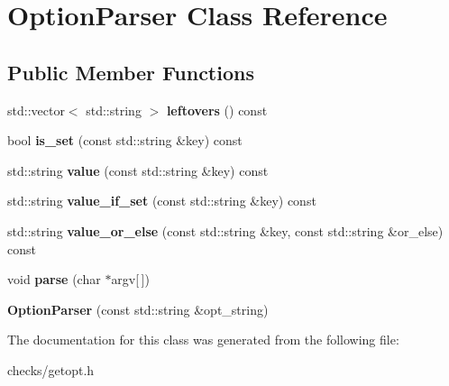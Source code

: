 \hypertarget{classOptionParser}{\section{Option\-Parser Class Reference}
\label{classOptionParser}
}
\subsection*{Public Member Functions}
\begin{DoxyCompactItemize}
\item 
\hypertarget{classOptionParser_ac4abcf013582dd09a6b7b2384c7a483b}{std\-::vector$<$ std\-::string $>$ {\bfseries leftovers} () const }\label{classOptionParser_ac4abcf013582dd09a6b7b2384c7a483b}

\item 
\hypertarget{classOptionParser_ae807908d951c495d7b5db4c970a939fc}{bool {\bfseries is\-\_\-set} (const std\-::string \&key) const }\label{classOptionParser_ae807908d951c495d7b5db4c970a939fc}

\item 
\hypertarget{classOptionParser_aae8bf74d5ea552dc83238045b53eda7e}{std\-::string {\bfseries value} (const std\-::string \&key) const }\label{classOptionParser_aae8bf74d5ea552dc83238045b53eda7e}

\item 
\hypertarget{classOptionParser_a95c5fefd45858094b4c7d29733fbdefd}{std\-::string {\bfseries value\-\_\-if\-\_\-set} (const std\-::string \&key) const }\label{classOptionParser_a95c5fefd45858094b4c7d29733fbdefd}

\item 
\hypertarget{classOptionParser_ae6bc68aae2beffc2f3c6486a9f633734}{std\-::string {\bfseries value\-\_\-or\-\_\-else} (const std\-::string \&key, const std\-::string \&or\-\_\-else) const }\label{classOptionParser_ae6bc68aae2beffc2f3c6486a9f633734}

\item 
\hypertarget{classOptionParser_a2826c8f1c7df0687eeea0cc45386fc1f}{void {\bfseries parse} (char $\ast$argv\mbox{[}$\,$\mbox{]})}\label{classOptionParser_a2826c8f1c7df0687eeea0cc45386fc1f}

\item 
\hypertarget{classOptionParser_ad644715beac344d4fd5615e96b06f65e}{{\bfseries Option\-Parser} (const std\-::string \&opt\-\_\-string)}\label{classOptionParser_ad644715beac344d4fd5615e96b06f65e}

\end{DoxyCompactItemize}


The documentation for this class was generated from the following file\-:\begin{DoxyCompactItemize}
\item 
checks/getopt.\-h\end{DoxyCompactItemize}
